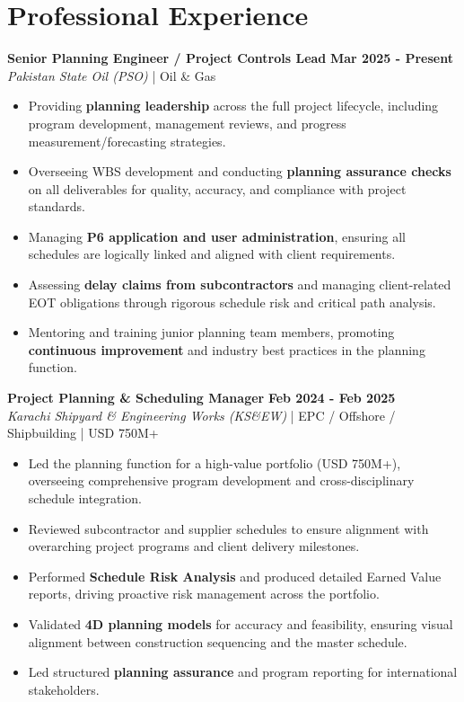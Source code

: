 \documentclass[11pt,a4paper]{article}
\begin{document}
\section{Professional Experience}
\noindent \textbf{\large Senior Planning Engineer / Project Controls Lead} \hfill \textbf{\color{awesome-blue}Mar 2025 - Present}\\
\textit{Pakistan State Oil (PSO)} | Oil \& Gas\\
\begin{itemize}
    \item Providing \textbf{planning leadership} across the full project lifecycle, including program development, management reviews, and progress measurement/forecasting strategies.
    \item Overseeing WBS development and conducting \textbf{planning assurance checks} on all deliverables for quality, accuracy, and compliance with project standards.
    \item Managing \textbf{P6 application and user administration}, ensuring all schedules are logically linked and aligned with client requirements.
    \item Assessing \textbf{delay claims from subcontractors} and managing client-related EOT obligations through rigorous schedule risk and critical path analysis.
    \item Mentoring and training junior planning team members, promoting \textbf{continuous improvement} and industry best practices in the planning function.
\end{itemize}

\noindent \textbf{\large Project Planning \& Scheduling Manager} \hfill \textbf{\color{awesome-blue}Feb 2024 - Feb 2025}\\
\textit{Karachi Shipyard \& Engineering Works (KS\&EW)} | EPC / Offshore / Shipbuilding | USD 750M+\\
\begin{itemize}
    \item Led the planning function for a high-value portfolio (USD 750M+), overseeing comprehensive program development and cross-disciplinary schedule integration.
    \item Reviewed subcontractor and supplier schedules to ensure alignment with overarching project programs and client delivery milestones.
    \item Performed \textbf{Schedule Risk Analysis} and produced detailed Earned Value reports, driving proactive risk management across the portfolio.
    \item Validated \textbf{4D planning models} for accuracy and feasibility, ensuring visual alignment between construction sequencing and the master schedule.
    \item Led structured \textbf{planning assurance} and program reporting for international stakeholders.
\end{itemize}
\end{document}
